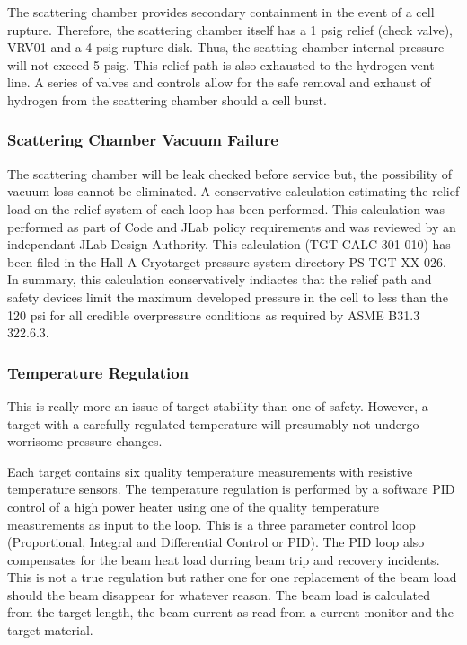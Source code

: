 The scattering chamber provides secondary containment in the event
of a cell rupture. Therefore, the scattering chamber itself has a
1 psig relief (check valve), VRV01 and a 4 psig rupture disk. Thus,
the scatting chamber internal pressure will not exceed 5 psig. This
relief path is also exhausted to the hydrogen vent line. A series
of valves and controls allow for the safe removal and exhaust of hydrogen
from the scattering chamber should a cell burst.


\subsubsection{Scattering Chamber Vacuum Failure}

\label{sec:cryo_targ_cmb_falure}

The scattering chamber will be leak checked before service but, the
possibility of vacuum loss cannot be eliminated. A conservative calculation
estimating the relief load on the relief system of each loop has been
performed. This calculation was performed as part of Code and JLab
policy requirements and was reviewed by an independant JLab Design
Authority. This calculation (TGT-CALC-301-010) has been filed in the
Hall A Cryotarget pressure system directory PS-TGT-XX-026. In summary,
this calculation conservatively indiactes that the relief path and
safety devices limit the maximum developed pressure in the cell to
less than the 120 psi for all credible overpressure conditions as
required by ASME B31.3 322.6.3.


\subsubsection{Temperature Regulation}

This is really more an issue of target stability than one of safety.
However, a target with a carefully regulated temperature will presumably
not undergo worrisome pressure changes.

Each target contains six quality temperature measurements with resistive
temperature sensors. The temperature regulation is performed by a
software PID control of a high power heater using one of the quality
temperature measurements as input to the loop. This is a three parameter
control loop (Proportional, Integral and Differential Control or PID).
The PID loop also compensates for the beam heat load durring beam
trip and recovery incidents. This is not a true regulation but rather
one for one replacement of the beam load should the beam disappear
for whatever reason. The beam load is calculated from the target length,
the beam current as read from a current monitor and the target material.

